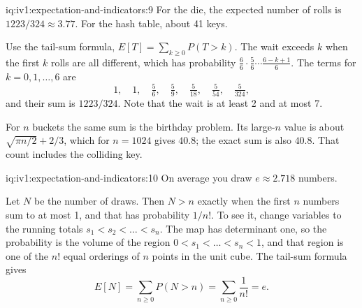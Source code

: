 \begin{solution}{iq:iv1:expectation-and-indicators:9}
For the die, the expected number of rolls is $1223/324 \approx 3.77$. For the hash table, about 41 keys.

Use the tail-sum formula, $E[T] = \sum_{k \ge 0} P(T > k)$. The wait exceeds $k$ when the first $k$ rolls are all different, which has
probability $\frac{6}{6}\cdot\frac{5}{6}\cdots\frac{6-k+1}{6}$. The terms for $k = 0, 1, \dots, 6$ are
\[
1,\quad 1,\quad \tfrac56,\quad \tfrac59,\quad \tfrac{5}{18},\quad \tfrac{5}{54},\quad \tfrac{5}{324},
\]
and their sum is $1223/324$. Note that the wait is at least 2 and at most 7.

For $n$ buckets the same sum is the birthday problem. Its large-$n$ value is about $\sqrt{\pi n/2} + 2/3$, which for
$n = 1024$ gives $40.8$; the exact sum is also $40.8$. That count includes the colliding key.

\end{solution}

\enlargethispage{-3\baselineskip}%
\begin{solution}{iq:iv1:expectation-and-indicators:10}
On average you draw $e \approx 2.718$ numbers.

Let $N$ be the number of draws. Then $N > n$ exactly when the first $n$ numbers sum to at most 1, and that has probability $1/n!$. To see
it, change variables to the running totals $s_1 < s_2 < \dots < s_n$. The map has determinant one, so the probability is the volume of the
region $0 < s_1 < \dots < s_n < 1$, and that region is one of the $n!$ equal orderings of $n$ points in the unit cube. The tail-sum
formula gives
\[
E[N] = \sum_{n \ge 0} P(N > n) = \sum_{n \ge 0} \frac{1}{n!} = e.
\]
\end{solution}

